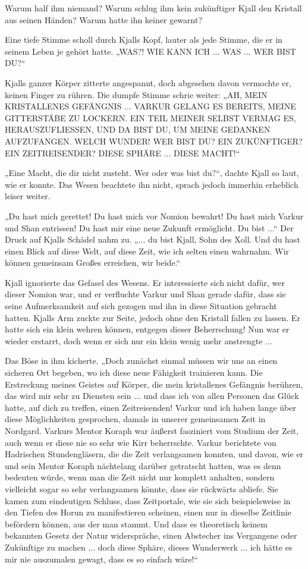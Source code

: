 Warum half ihm niemand? Warum schlug ihm kein zukünftiger Kjall den Kristall aus seinen Händen? Warum hatte ihn keiner gewarnt?

Eine tiefe Stimme scholl durch Kjalls Kopf, lauter als jede Stimme, die er in seinem Leben je gehört hatte. „WAS?! WIE KANN ICH ... WAS ... WER BIST DU?“

Kjalls ganzer Körper zitterte angespannt, doch abgesehen davon vermochte er, keinen Finger zu rühren. Die dumpfe Stimme schrie weiter: „AH, MEIN KRISTALLENES GEFÄNGNIS ... VARKUR GELANG ES BEREITS, MEINE GITTERSTÄBE ZU LOCKERN. EIN TEIL MEINER SELBST VERMAG ES, HERAUSZUFLIESSEN, UND DA BIST DU, UM MEINE GEDANKEN AUFZUFANGEN. WELCH WUNDER! WER BIST DU? EIN ZUKÜNFTIGER? EIN ZEITREISENDER? DIESE SPHÄRE ... DIESE MACHT!“

„Eine Macht, die dir nicht zusteht. Wer oder was bist du?“, dachte Kjall so laut, wie er konnte. Das Wesen beachtete ihn nicht, sprach jedoch immerhin erheblich leiser weiter.

„Du hast mich gerettet! Du hast mich vor Nomion bewahrt! Du hast mich Varkur und Shan entrissen! Du hast mir eine neue Zukunft ermöglicht. Du bist ...“ Der Druck auf Kjalls Schädel nahm zu. „... du bist Kjall, Sohn des Xoll. Und du hast einen Blick auf diese Welt, auf diese Zeit, wie ich selten einen wahrnahm. Wir können gemeinsam Großes erreichen, wir beide.“

Kjall ignorierte das Gefasel des Wesens. Er interessierte sich nicht dafür, wer dieser Nomion war, und er verfluchte Varkur und Shan gerade dafür, dass sie seine Aufmerksamkeit auf sich gezogen und ihn in diese Situation gebracht hatten. Kjalls Arm zuckte zur Seite, jedoch ohne den Kristall fallen zu lassen. Er hatte sich ein klein wehren können, entgegen dieser Beherrschung! Nun war er wieder erstarrt, doch wenn er sich nur ein klein wenig mehr anstrengte ...

Das Böse in ihm kicherte. „Doch zunächst einmal müssen wir uns an einen sicheren Ort begeben, wo ich diese neue Fähigkeit trainieren kann. Die Erstreckung meines Geistes auf Körper, die mein kristallenes Gefängnis berühren, das wird mir sehr zu Diensten sein ... und dass ich von allen Personen das Glück hatte, auf dich zu treffen, einen Zeitreisenden! Varkur und ich haben lange über diese Möglichkeiten gesprochen, damals in unserer gemeinsamen Zeit in Nordgard. Varkurs Mentor Koraph war äußerst fasziniert vom Studium der Zeit, auch wenn er diese nie so sehr wie Kirr beherrschte. Varkur berichtete von Hadrischen Stundengläsern, die die Zeit verlangsamen konnten, und davon, wie er und sein Mentor Koraph nächtelang darüber getratscht hatten, was es denn bedeuten würde, wenn man die Zeit nicht nur komplett anhalten, sondern vielleicht sogar so sehr verlangsamen könnte, dass sie rückwärts abliefe. Sie kamen zum eindeutigen Schluss, dass Zeitportale, wie sie sich beispielsweise in den Tiefen des Horun zu manifestieren scheinen, einen nur in dieselbe Zeitlinie befördern können, aus der man stammt. Und dass es theoretisch keinem bekannten Gesetz der Natur widerspräche, einen Abstecher ins Vergangene oder Zukünftige zu machen ... doch diese Sphäre, dieses Wunderwerk ... ich hätte es mir nie auszumalen gewagt, dass es so einfach wäre!“

